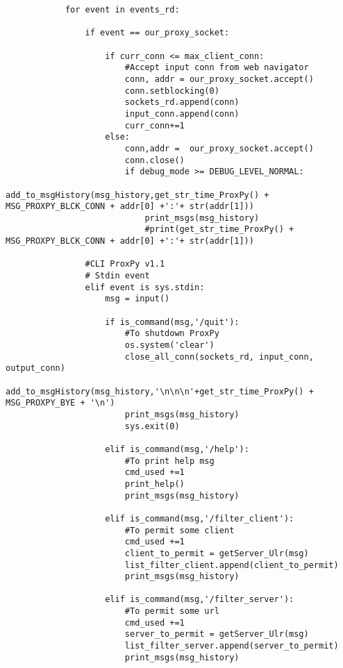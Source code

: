 \begin{verbatim}
            for event in events_rd:

                if event == our_proxy_socket:
                    
                    if curr_conn <= max_client_conn:
                        #Accept input conn from web navigator
                        conn, addr = our_proxy_socket.accept()
                        conn.setblocking(0)
                        sockets_rd.append(conn)
                        input_conn.append(conn)
                        curr_conn+=1
                    else:
                        conn,addr =  our_proxy_socket.accept()
                        conn.close()
                        if debug_mode >= DEBUG_LEVEL_NORMAL:
                            add_to_msgHistory(msg_history,get_str_time_ProxPy() + MSG_PROXPY_BLCK_CONN + addr[0] +':'+ str(addr[1]))
                            print_msgs(msg_history)
                            #print(get_str_time_ProxPy() + MSG_PROXPY_BLCK_CONN + addr[0] +':'+ str(addr[1]))

                #CLI ProxPy v1.1
                # Stdin event
                elif event is sys.stdin:
                    msg = input()

                    if is_command(msg,'/quit'):
                        #To shutdown ProxPy
                        os.system('clear')
                        close_all_conn(sockets_rd, input_conn, output_conn)
                        add_to_msgHistory(msg_history,'\n\n\n'+get_str_time_ProxPy() + MSG_PROXPY_BYE + '\n')
                        print_msgs(msg_history)
                        sys.exit(0)

                    elif is_command(msg,'/help'):
                        #To print help msg
                        cmd_used +=1 
                        print_help()
                        print_msgs(msg_history)

                    elif is_command(msg,'/filter_client'):
                        #To permit some client
                        cmd_used +=1 
                        client_to_permit = getServer_Ulr(msg)
                        list_filter_client.append(client_to_permit)
                        print_msgs(msg_history)

                    elif is_command(msg,'/filter_server'):
                        #To permit some url
                        cmd_used +=1 
                        server_to_permit = getServer_Ulr(msg)
                        list_filter_server.append(server_to_permit)
                        print_msgs(msg_history)


\end{verbatim}
